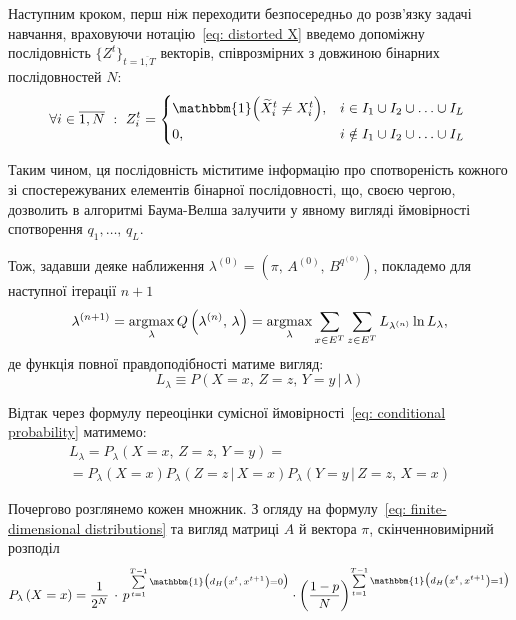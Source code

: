 Наступним кроком, перш ніж переходити безпосередньо до розв'язку задачі навчання, враховуючи нотацію~\eqref{eq: distorted X} введемо допоміжну послідовність $\{ Z^t \}_{t=\overline{1,T}}$ векторів, співрозмірних з довжиною бінарних послідовностей $N:$
\begin{equation*}
    \forall i \in \overline{1,N}\ :\ Z^t_i =
    \begin{cases*}
        \mathbbm{1} \Bigl( \widetilde{X}^t_i \neq X^t_i \Bigr), & $i \in I_1 \cup I_2 \cup \ldots \cup I_L$ \\
        0, & $i \notin I_1 \cup I_2 \cup \ldots \cup I_L$ \\
    \end{cases*}
\end{equation*}

Таким чином, ця послідовність міститиме інформацію про спотвореність кожного зі спостережуваних елементів бінарної послідовності, що, своєю чергою, дозволить в алгоритмі Баума-Велша залучити у явному вигляді ймовірності спотворення $q_1,\ldots,\,q_L$.

\newpage
Тож, задавши деяке наближення $\lambda^{(0)}=(\pi,\,A^{(0)},\,B^{q^{(0)}})$, покладемо для наступної ітерації $n+1$
\begin{equation*}
    \lambda^{(n+1)} = \operatorname*{argmax}\limits_{\lambda} Q\left( \lambda^{(n)},\,\lambda \right) = \operatorname*{argmax}\limits_{\lambda} \sum\limits_{x \in E^T} \sum\limits_{z \in E^T} L_{\lambda^{(n)}} \ln L_{\lambda},
\end{equation*}
де функція повної правдоподібності матиме вигляд:
\begin{equation*}
    L_{\lambda} \equiv P\left( X=x,\,Z=z,\,Y=y \,|\, \lambda \right)
\end{equation*}

Відтак через формулу переоцінки сумісної ймовірності~\eqref{eq: conditional probability} матимемо:
\begin{multline*}
    L_{\lambda} = P_\lambda \left( X=x,\,Z=z,\,Y=y \right) = \\ 
    = P_\lambda \left( X=x \right) P_\lambda \left( Z=z \,|\, X=x \right) P_\lambda \left( Y=y \,|\, Z=z,\,X=x \right)
\end{multline*}

Почергово розглянемо кожен множник. З огляду на формулу~\eqref{eq: finite-dimensional distributions} та вигляд матриці $A$ й вектора $\pi$, скінченновимірний розподіл
\begin{equation*}
    P_\lambda \left( X=x \right) = \frac{1}{2^N}\, \cdot\, p^{\sum\limits_{t=1}^{T-1} \mathbbm{1} \bigl( d_H\left( x^t,\,x^{t+1} \right) = 0 \bigr)} \cdot \left(\frac{1-p}{N}\right)^{\sum\limits_{t=1}^{T-1} \mathbbm{1} \bigl( d_H\left( x^t,\,x^{t+1} \right) = 1 \bigr)}
\end{equation*}

